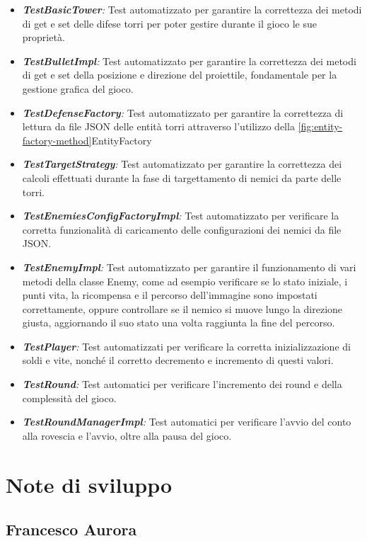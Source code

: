 \documentclass[a4paper,12pt]{report}
\begin{document}
\begin{itemize}
    \item \textit{\textbf{TestBasicTower}:} Test automatizzato per garantire la correttezza dei metodi di get e set delle difese torri per poter gestire durante il gioco le sue proprietà.
    \item \textit{\textbf{TestBulletImpl}:} Test automatizzato per garantire la correttezza dei metodi di get e set della posizione e direzione del proiettile, fondamentale per la gestione grafica del gioco.
    \item \textit{\textbf{TestDefenseFactory}:} Test automatizzato per garantire la correttezza di lettura da file JSON delle entità torri attraverso l'utilizzo della \ref{fig:entity-factory-method}EntityFactory
    \item \textit{\textbf{TestTargetStrategy}:} Test automatizzato per garantire la correttezza dei calcoli effettuati durante la fase di targettamento di nemici da parte delle torri.
    \item \textit{\textbf{TestEnemiesConfigFactoryImpl}:} Test automatizzato per verificare la corretta funzionalità di caricamento delle configurazioni dei nemici da file JSON.
    \item \textit{\textbf{TestEnemyImpl}:} Test automatizzato per garantire il funzionamento di vari metodi della classe Enemy, come ad esempio verificare se lo stato iniziale, i punti vita, la ricompensa e il percorso dell'immagine sono impostati correttamente, oppure controllare se il nemico si muove lungo la direzione giusta,  aggiornando il suo stato una volta raggiunta la fine del percorso. 
	\item \textit{\textbf{TestPlayer}:} Test automatizzati per verificare la corretta inizializzazione di soldi e vite, nonché il corretto decremento e incremento di questi valori.
	\item \textit{\textbf{TestRound}:} Test automatici per verificare l'incremento dei round e della complessità del gioco.
	\item \textit{\textbf{TestRoundManagerImpl}:} Test automatici per verificare l'avvio del conto alla rovescia e l'avvio, oltre alla pausa del gioco.
\end{itemize}

\section{Note di sviluppo}

\subsection{Francesco Aurora}
\end{document}
